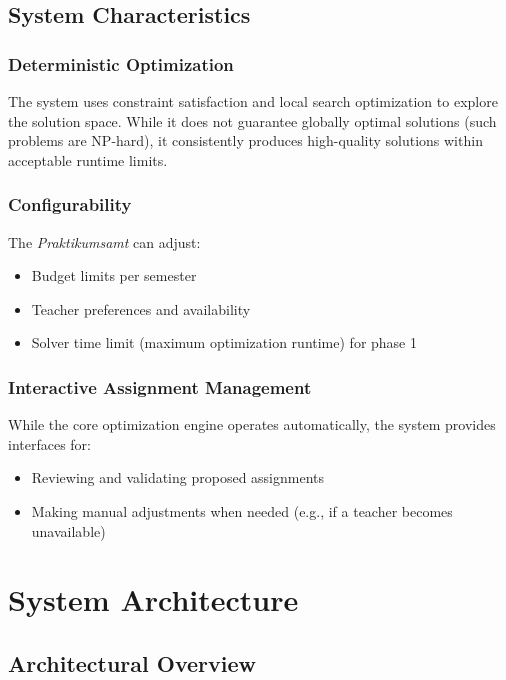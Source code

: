 \documentclass[12pt,a4paper]{report}
\begin{document}
\section{System Characteristics}

\subsection{Deterministic Optimization}

The system uses constraint satisfaction and local search optimization to explore the solution space. While it does not guarantee globally optimal solutions (such problems are NP-hard), it consistently produces high-quality solutions within acceptable runtime limits.

\subsection{Configurability}

The \textit{Praktikumsamt} can adjust:
\begin{itemize}
    \item Budget limits per semester
    \item Teacher preferences and availability
    \item Solver time limit (maximum optimization runtime) for phase 1
\end{itemize}

\subsection{Interactive Assignment Management}

While the core optimization engine operates automatically, the system provides interfaces for:
\begin{itemize}
    \item Reviewing and validating proposed assignments
    \item Making manual adjustments when needed (e.g., if a teacher becomes unavailable)
\end{itemize}


\chapter{System Architecture}

\section{Architectural Overview}
\end{document}
